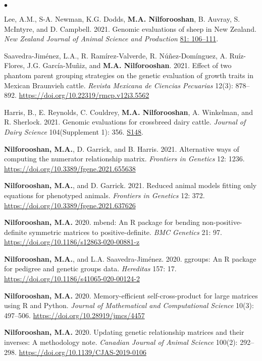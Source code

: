 \documentclass[margin,line]{res}
\newenvironment{list2}{
  \begin{list}{$\bullet$}{%
      \setlength{\itemsep}{0in}
      \setlength{\parsep}{0in} \setlength{\parskip}{0in}
      \setlength{\topsep}{0in} \setlength{\partopsep}{0in}
      \setlength{\leftmargin}{0.2in}}}{\end{list}}
\begin{document}
\begin{resume}
\begin{list2}
    \item Lee, A.M., S-A. Newman, K.G. Dodds, {\bf M.A. Nilforooshan}, B. Auvray, S. McIntyre, and D. Campbell. 2021. Genomic evaluations of sheep in New Zealand. {\em New Zealand Journal of Animal Science and Production} \href{http://www.nzsap.org/proceedings/genomic-evaluations-sheep-new-zealand}{81: 106--111}.
    \item Saavedra-Jim\'{e}nez, L.A., R. Ram\'{i}rez-Valverde, R. N\'{u}\~{n}ez-Dom\'{i}nguez, A. Ru\'{i}z-Flores, J.G. Garc\'{i}a-Mu\~{n}iz, and {\bf M.A. Nilforooshan}. 2021. Effect of two phantom parent grouping strategies on the genetic evaluation of growth traits in Mexican Braunvieh cattle. {\em Revista Mexicana de Ciencias Pecuarias} 12(3): 878--892. \url{https://doi.org/10.22319/rmcp.v12i3.5562}
    \item Harris, B., E. Reynolds, C. Couldrey, {\bf M.A. Nilforooshan}, A. Winkelman, and R. Sherlock. 2021. Genomic evaluations for crossbreed dairy cattle. {\em Journal of Dairy Science} 104(Supplement 1): 356. \href{https://www.adsa.org/Portals/0/SiteContent/Docs/Meetings/2021ADSA/ADSA2021_Abstracts.pdf}{S148}.
    \item {\bf Nilforooshan, M.A.}, D. Garrick, and B. Harris. 2021. Alternative ways of computing the numerator relationship matrix. {\em Frontiers in Genetics} 12: 1236. \url{https://doi.org/10.3389/fgene.2021.655638}
    \item {\bf Nilforooshan, M.A.}, and D. Garrick. 2021. Reduced animal models fitting only equations for phenotyped animals. {\em Frontiers in Genetics} 12: 372. \url{https://doi.org/10.3389/fgene.2021.637626}
    \item {\bf Nilforooshan, M.A.} 2020. mbend: An R package for bending non-positive-deﬁnite symmetric matrices to positive-deﬁnite. {\em BMC Genetics} 21: 97. \url{https://doi.org/10.1186/s12863-020-00881-z}
    \item {\bf Nilforooshan, M.A.}, and L.A. Saavedra-Jim\'{e}nez. 2020. ggroups: An R package for pedigree and genetic groups data. {\em Hereditas} 157: 17. \url{https://doi.org/10.1186/s41065-020-00124-2}
    \item {\bf Nilforooshan, M.A.} 2020. Memory-efficient self-cross-product for large matrices using R and Python. {\em Journal of Mathematical and Computational Science} 10(3): 497--506. \url{https://doi.org/10.28919/jmcs/4457}
    \item {\bf Nilforooshan, M.A.} 2020. Updating genetic relationship matrices and their inverses: A methodology note. {\em Canadian Journal of Animal Science} 100(2): 292--298. \url{https://doi.org/10.1139/CJAS-2019-0106}

\end{list2}
\end{resume}
\end{document}
